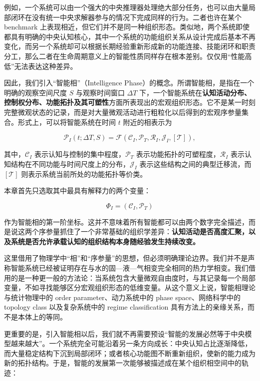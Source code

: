 例如，一个系统可以由一个强大的中央推理器处理绝大部分任务，也可以由大量局部闭环在没有统一中央求解器参与的情况下完成同样的行为。二者也许在某个 benchmark 上表现相近，但它们并不是同一种组织形态。类似地，两个系统即使都具有明确的中央认知核心，其中一个系统的功能组织关系从设计完成后基本不再变化，而另一个系统却可以根据长期经验重新形成新的功能连接、技能闭环和职责分工，那么二者在生命周期意义上的智能性质同样存在根本差别。仅仅用“性能高低”无法表达这种差异。

因此，我们引入“智能相”（Intelligence Phase）的概念。所谓智能相，是指在一个明确的观察空间尺度 $S$ 与观察时间窗口 $\Delta T$ 下，一个智能系统在\textbf{认知活动分布、控制权分布、功能拓扑及其可塑性}方面所表现出的宏观组织形态。它不是某一时刻完整微观状态的记录，而是对大量微观活动进行粗粒化以后得到的宏观序参量集合。形式上，可以将智能系统在时间 $t$ 附近的相表示为

\begin{equation}
\mathcal{P}_{I}(t;\Delta T,S)
=
\mathcal{F}
\left(
\mathcal{C}_{I},
\mathcal{P}_{T},
\mathcal{R}_{I},
\mathcal{J}_{I},
[\mathcal{T}]
\right),
\end{equation}

其中，$\mathcal{C}_{I}$ 表示认知与控制的集中程度，$\mathcal{P}_{T}$ 表示功能拓扑的可塑程度，$\mathcal{R}_{I}$ 表示认知结构在不同功能与时间尺度上的分布，$\mathcal{J}_{I}$ 表示这些结构之间的典型迁移流，而 $[\mathcal{T}]$ 则表示系统当前所处的功能拓扑等价类。

本章首先只选取其中最具有解释力的两个变量：

\begin{equation}
\boxed{
\Phi_{I}
=
\left(
\mathcal{C}_{I},
\mathcal{P}_{T}
\right)
}
\end{equation}

作为智能相的第一阶坐标。这并不意味着所有智能都可以由两个数字完全描述，而是说这两个序参量抓住了一个非常基础的组织学差异：\textbf{认知活动是否高度汇聚，以及系统是否允许承载认知的组织结构本身随经验发生持续改变。}

这里借用了物理学中“相”和“序参量”的思想，但必须明确理论边界。我们并不是声称智能系统已经被证明存在与水的固—液—气相变完全相同的热力学相变。我们借用的是一种更一般的方法论：当系统包含大量微观自由度时，与其记录每一个局部变量，不如寻找能够区分宏观组织形态的低维变量。从这个意义上说，智能相理论与统计物理中的 order parameter、动力系统中的 phase space、网络科学中的 topology class 以及复杂系统中的 regime classification 具有方法上的亲缘关系，而不是本体上的等同。

更重要的是，引入智能相以后，我们就不再需要预设“智能的发展必然等于中央模型越来越大”。一个系统完全可能沿着另一条方向成长：中央认知占比逐渐降低，而大量稳定结构下沉到局部闭环；或者核心功能图不断重新组织，使新的能力成为新的拓扑结构。于是，智能的发展第一次能够被描述成在某个组织相空间中的轨迹：

